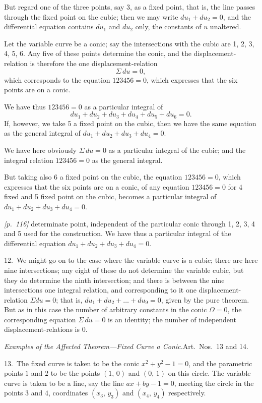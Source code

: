 \documentclass[11pt,a4paper]{article}
\theoremstyle{plain}
\theoremstyle{definition}
\theoremstyle{remark}
\begin{document}
But regard one of the three points, say 3, as a fixed point, that is, the line passes through the fixed point on the cubic; then we may write $du_1 + du_2 = 0$, and the differential equation contains $du_1$ and $du_2$ only, the constants of $u$ unaltered.

Let the variable curve be a conic; say the intersections with the cubic are 1, 2, 3, 4, 5, 6. Any five of these points determine the conic, and the displacement-relation is therefore the one displacement-relation
\[
\Sigma\,du = 0,
\]
which corresponds to the equation $123456 = 0$, which expresses that the six points are on a conic.

We have thus $123456 = 0$ as a particular integral of
\[
du_1 + du_2 + du_3 + du_4 + du_5 + du_6 = 0.
\]
If, however, we take 5 a fixed point on the cubic, then we have the same equation as the general integral of $du_1 + du_2 + du_3 + du_4 = 0$.

We have here obviously $\Sigma\,du = 0$ as a particular integral of the cubic; and the integral relation $123456 = 0$ as the general integral.

But taking also 6 a fixed point on the cubic, the equation $123456 = 0$, which expresses that the six points are on a conic, of any equation $123456 = 0$ for 4 fixed and 5 fixed point on the cubic, becomes a particular integral of $du_1 + du_2 + du_3 + du_4 = 0$.

\noindent\textit{[p.~116]} determinate point, independent of the particular conic through 1, 2, 3, 4 and 5 used for the construction. We have thus a particular integral of the differential equation $du_1 + du_2 + du_3 + du_4 = 0$.

12.\ We might go on to the case where the variable curve is a cubic; there are here nine intersections; any eight of these do not determine the variable cubic, but they do determine the ninth intersection; and there is between the nine intersections one integral relation, and corresponding to it one displacement-relation $\Sigma du = 0$; that is, $du_1 + du_2 + \ldots + du_9 = 0$, given by the pure theorem. But as in this case the number of arbitrary constants in the conic $\Omega = 0$, the corresponding equation $\Sigma\,du = 0$ is an identity; the number of independent displacement-relations is $0$.

\textit{Examples of the Affected Theorem---Fixed Curve a Conic.}\quad Art.\ Nos.~13 and 14.

13.\ The fixed curve is taken to be the conic $x^2 + y^2 - 1 = 0$, and the parametric points $1$ and $2$ to be the points $(1,\,0)$ and $(0,\,1)$ on this circle. The variable curve is taken to be a line, say the line $ax + by - 1 = 0$, meeting the circle in the points $3$ and $4$, coordinates $(x_3,\,y_3)$ and $(x_4,\,y_4)$ respectively.
\end{document}
